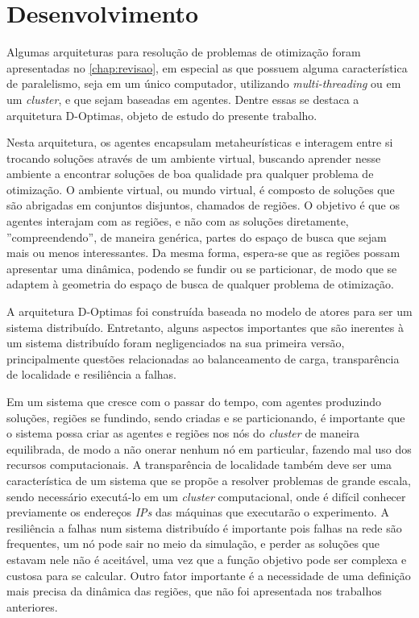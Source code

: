 

\chapter{Desenvolvimento}
\label{chap:desenvolvimento}

Algumas arquiteturas para resolução de problemas de otimização foram apresentadas no \autoref{chap:revisao}, em especial as que possuem alguma característica de paralelismo, seja em um único computador, utilizando \textit{multi-threading} ou em um \textit{cluster}, e que sejam baseadas em agentes. Dentre essas se destaca a arquitetura D-Optimas, objeto de estudo do presente trabalho. 

Nesta arquitetura, os agentes encapsulam metaheurísticas e interagem entre si trocando soluções através de um ambiente virtual, buscando aprender nesse ambiente a encontrar soluções de boa qualidade pra qualquer problema de otimização. O ambiente virtual, ou mundo virtual, é composto de soluções que são abrigadas em conjuntos disjuntos, chamados de regiões. O objetivo é que os agentes interajam com as regiões, e não com as soluções diretamente, ''compreendendo'', de maneira genérica, partes do espaço de busca que sejam mais ou menos interessantes. Da mesma forma, espera-se que as regiões possam apresentar uma dinâmica, podendo se fundir ou se particionar, de modo que se adaptem à geometria do espaço de busca de qualquer problema de otimização.   

A arquitetura D-Optimas foi construída baseada no modelo de atores para ser um sistema distribuído. Entretanto, alguns aspectos importantes que são inerentes à um sistema distribuído foram negligenciados na sua primeira versão, principalmente questões relacionadas ao balanceamento de carga, transparência de localidade e resiliência a falhas.

Em um sistema que cresce com o passar do tempo, com agentes produzindo soluções, regiões se fundindo, sendo criadas e se particionando, é importante que o sistema possa criar as agentes e regiões nos nós do \textit{cluster} de maneira equilibrada, de modo a não onerar nenhum nó em particular, fazendo mal uso dos recursos computacionais. A transparência de localidade também deve ser uma característica de um sistema que se propõe a resolver problemas de grande escala, sendo necessário executá-lo em um \textit{cluster} computacional, onde é difícil conhecer previamente os endereços \textit{IPs} das máquinas que executarão o experimento. A resiliência a falhas num sistema distribuído é importante pois falhas na rede são frequentes, um nó pode sair no meio da simulação, e perder as soluções que estavam nele não é aceitável, uma vez que a função objetivo pode ser complexa e custosa para se calcular.
Outro fator importante é a necessidade de uma definição mais precisa da dinâmica das regiões,  que não foi apresentada nos trabalhos anteriores.

